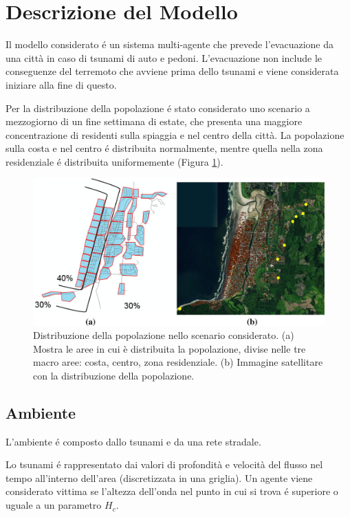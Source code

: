 \section{Descrizione del Modello}
Il modello considerato \cite{mostafizi2019agent} é un sistema multi-agente che prevede l'evacuazione da una città in caso di tsunami di auto e pedoni.
%
L'evacuazione non include le conseguenze del terremoto che avviene prima dello tsunami e viene considerata iniziare alla fine di questo.

Per la distribuzione della popolazione é stato considerato uno scenario a mezzogiorno di un fine settimana di estate,
che presenta una maggiore concentrazione di residenti sulla spiaggia e nel centro della città.
%
La popolazione sulla costa e nel centro é distribuita normalmente,
mentre quella nella zona residenziale é distribuita uniformemente (Figura \ref{fig:population}).

\begin{figure}
  \includegraphics[width=\textwidth]{images/population}
  \caption{Distribuzione della popolazione nello scenario considerato.
    (a) Mostra le aree in cui è distribuita la popolazione, divise nelle tre macro aree: costa, centro, zona residenziale.
    (b) Immagine satellitare con la distribuzione della popolazione.}
  \label{fig:population}
\end{figure}

\subsection{Ambiente}
L'ambiente é composto dallo tsunami e da una rete stradale.

Lo tsunami é rappresentato dai valori di profondità e velocità del flusso nel tempo all'interno dell'area (discretizzata in una griglia).
Un agente viene considerato vittima se l'altezza dell'onda nel punto in cui si trova é superiore o uguale a un parametro $H_c$.

